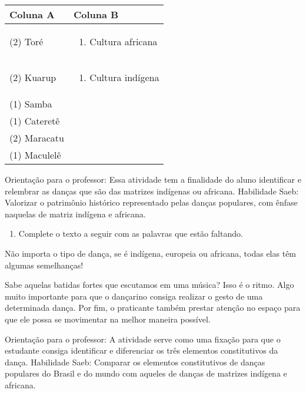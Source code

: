 \begin{longtable}[]{@{}ll@{}}
\toprule
Coluna A & Coluna B\tabularnewline
\midrule
\endhead
\begin{minipage}[t]{0.48\columnwidth}\raggedright\strut
(2) Toré\strut
\end{minipage} & \begin{minipage}[t]{0.48\columnwidth}\raggedright\strut
\begin{enumerate}
\def\labelenumi{(\arabic{enumi})}
\item
  Cultura africana
\end{enumerate}\strut
\end{minipage}\tabularnewline
\begin{minipage}[t]{0.48\columnwidth}\raggedright\strut
(2) Kuarup\strut
\end{minipage} & \begin{minipage}[t]{0.48\columnwidth}\raggedright\strut
\begin{enumerate}
\def\labelenumi{(\arabic{enumi})}
\item
  Cultura indígena
\end{enumerate}\strut
\end{minipage}\tabularnewline
(1) Samba &\tabularnewline
(1) Cateretê &\tabularnewline
(2) Maracatu &\tabularnewline
(1) Maculelê &\tabularnewline
\bottomrule
\end{longtable}

Orientação para o professor: Essa atividade tem a finalidade do aluno
identificar e relembrar as danças que são das matrizes indígenas ou
africana. Habilidade Saeb: Valorizar o patrimônio histórico representado
pelas danças populares, com ênfase naquelas de matriz indígena e
africana.

\begin{enumerate}
\def\labelenumi{\arabic{enumi}.}
\item
  Complete o texto a seguir com as palavras que estão faltando.
\end{enumerate}

Não importa o tipo de dança, se é indígena, europeia ou africana, todas
elas têm algumas semelhanças!

Sabe aquelas batidas fortes que escutamos em uma música? Isso é o ritmo.
Algo muito importante para que o dançarino consiga realizar o gesto de
uma determinada dança. Por fim, o praticante também prestar atenção no
espaço para que ele possa se movimentar na melhor maneira possível.

Orientação para o professor: A atividade serve como uma fixação para que
o estudante consiga identificar e diferenciar os três elementos
constitutivos da dança. Habilidade Saeb: Comparar os elementos
constitutivos de danças populares do Brasil e do mundo com aqueles de
danças de matrizes indígena e africana.

